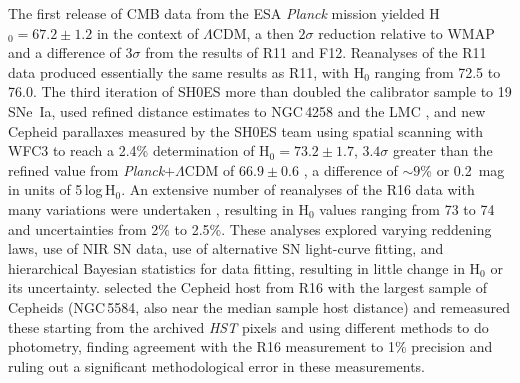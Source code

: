 \documentclass[12pt]{aastex631}
\begin{document}
The first release of CMB data from the ESA {\it Planck} mission \citep{Planck:2013} yielded H$_0=67.2\pm1.2$ in the context of $\Lambda$CDM, a then $2\sigma$ reduction relative to WMAP and a difference of $3\sigma$ from the results of R11 and F12.  Reanalyses of the R11 data \citep{Fiorentino:2013,Efstathiou:2014,Zhang:2017} produced essentially the same results as R11, with H$_0$ ranging from 72.5 to 76.0. The third iteration of SH0ES \citep[][hereafter R16]{Riess:2016} more than doubled the calibrator sample to 19 SNe~Ia, used refined distance estimates to NGC$\,$4258 and the LMC \citep{Pietrzynski:2013}, and new Cepheid parallaxes measured by the SH0ES team using spatial scanning with WFC3 \citep{riess14, Casertano:2016} to reach a 2.4\% determination of H$_0=73.2\pm1.7$, $3.4\sigma$ greater than the refined value from {\it Planck}$+\Lambda$CDM of $66.9\pm0.6$ \citep{Planck:2016}, a difference of $\sim 9$\% or 0.2~mag in units of 5\,log\,H$_0$.  An extensive number of reanalyses of the R16 data with many variations were undertaken \citep{Cardona:2017,Feeney:2017,Follin:2017,Bovy:2018,Burns:2018,Dhawan:2018,Avelino:2019}, resulting in H$_0$ values ranging from 73 to 74 and uncertainties from 2\% to 2.5\%.  These analyses explored varying reddening laws, use of NIR SN data, use of alternative SN light-curve fitting, and hierarchical Bayesian statistics for data fitting, resulting in little change in H$_0$ or its uncertainty. \citet{Javanmardi:2021} selected the Cepheid host from R16 with the largest sample of Cepheids (NGC$\,$5584, also near the median sample host distance) and remeasured these starting from the archived {\it HST} pixels and using different methods to do photometry, finding agreement with the R16 measurement to 1\% precision and ruling out a significant methodological error in these measurements.  
\end{document}
